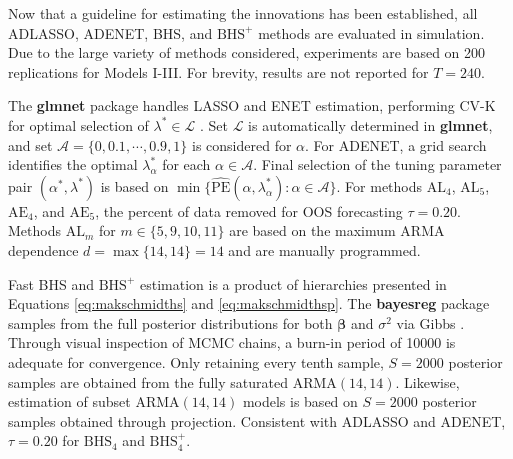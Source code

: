 Now that a guideline for estimating the innovations has been established, all ADLASSO, ADENET, BHS, and $\textrm{BHS}^+$ methods are evaluated in simulation. Due to the large variety of methods considered, experiments are based on 200 replications for Models I-III. For brevity, results are not reported for $T=240$.

The {\bf glmnet} package handles LASSO and ENET estimation, performing CV-K for optimal selection of $\lambda^* \in \mathcal{L}$ \citep{glmnet}. Set $\mathcal{L}$ is automatically determined in {\bf glmnet}, and set $\mathcal{A}=\{0,0.1,\cdots,0.9,1\}$ is considered for $\alpha$. For ADENET,  a grid search identifies the optimal $\lambda^*_\alpha$ for each $\alpha \in \mathcal{A}$. Final selection of the tuning parameter pair $(\alpha^*,\lambda^*)$ is based on $\min\{\widehat{\textrm{PE}}(\alpha,\lambda^*_\alpha):\alpha \in \mathcal{A}\}$. For methods $\textrm{AL}_{4}$, $\textrm{AL}_{5}$, $\textrm{AE}_{4}$, and $\textrm{AE}_{5}$, the percent of data removed for OOS forecasting $\tau=0.20$. Methods $\textrm{AL}_{m}$ for $m\in\{5,9,10,11\}$ are based on the maximum ARMA dependence $d=\max\{14,14\}=14$ and are manually programmed.

Fast BHS and $\textrm{BHS}^+$ estimation is a product of hierarchies presented in Equations \ref{eq:makschmidths} and \ref{eq:makschmidthsp}. The {\bf bayesreg} package samples from the full posterior distributions for both $\bm{\beta}$ and $\sigma^2$ via Gibbs \citep{bayesreg}. Through visual inspection of MCMC chains, a burn-in period of 10000 is adequate for convergence. Only retaining every tenth sample, $S=2000$ posterior samples are obtained from the fully saturated ARMA$(14,14)$. Likewise, estimation of subset ARMA$(14,14)$ models is based on $S=2000$ posterior samples obtained through projection.  Consistent with ADLASSO and ADENET, $\tau=0.20$ for $\textrm{BHS}_{4}$ and $\textrm{BHS}^+_{4}$.

